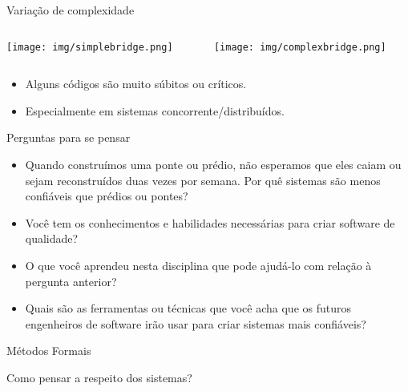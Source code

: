 \begin{frame}{Variação de complexidade}\small

  \begin{columns}
    \begin{column}{.5\textwidth}
      \begin{center}
        \texttt{[image: img/simplebridge.png]}
      \end{center}
    \end{column}

    \begin{column}{.5\textwidth}
      \begin{center}
        \texttt{[image: img/complexbridge.png]}        
      \end{center}
    \end{column}
  \end{columns}

  \begin{itemize}
  \item<2-> Alguns códigos são muito súbitos ou críticos.
  \item<3-> Especialmente em sistemas concorrente/distribuídos.
  \end{itemize}
  
\end{frame}

\begin{frame}{Perguntas para se pensar}

  \begin{itemize}
  \item<1-> Quando construímos uma ponte ou prédio, não esperamos que eles caiam ou sejam
    reconstruídos duas vezes por semana. Por quê sistemas são menos confiáveis que prédios
    ou pontes?
  \item<2-> Você tem os conhecimentos e habilidades necessárias para
    criar software de qualidade?
  \item<3-> O que você aprendeu nesta disciplina que pode ajudá-lo com
    relação à pergunta anterior?
  \item<4-> Quais são as ferramentas ou técnicas que você acha que os futuros
    engenheiros de software irão usar para criar sistemas mais confiáveis?
  \end{itemize}
    
\end{frame}


\begin{frame}{Métodos Formais}

  \alert{Como pensar a respeito dos sistemas?}



  
\end{frame}

